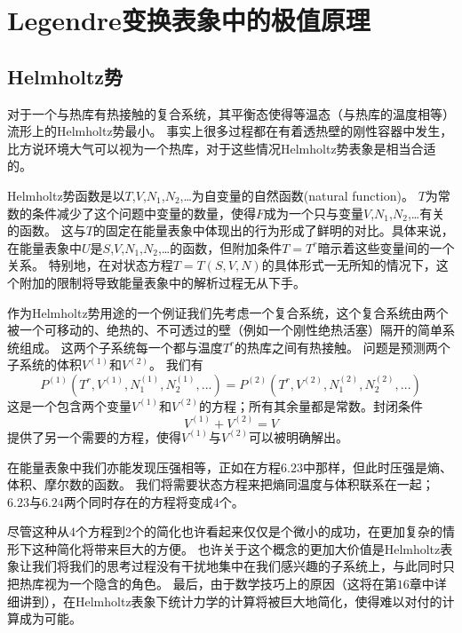 \chapter{Legendre变换表象中的极值原理}
\label{chap6}

\section{Helmholtz势}
\label{sec6.2}

对于一个与热库有热接触的复合系统，其平衡态使得等温态（与热库的温度相等）流形上的Helmholtz势最小。
事实上很多过程都在有着透热壁的刚性容器中发生，比方说环境大气可以视为一个热库，对于这些情况Helmholtz势表象是相当合适的。

 Helmholtz势函数是以$T$,$V$,$N_1$,$N_2$,…为自变量的自然函数(natural function)。
$T$为常数的条件减少了这个问题中变量的数量，使得$F$成为一个只与变量$V$,$N_1$,$N_2$,…有关的函数。
这与$T$的固定在能量表象中体现出的行为形成了鲜明的对比。具体来说，在能量表象中$U$是$S$,$V$,$N_1$,$N_2$,…的函数，但附加条件$T=T^r$暗示着这些变量间的一个关系。
特别地，在对状态方程$T=T(S, V, N)$的具体形式一无所知的情况下，这个附加的限制将导致能量表象中的解析过程无从下手。

作为Helmholtz势用途的一个例证我们先考虑一个复合系统，这个复合系统由两个被一个可移动的、绝热的、不可透过的壁（例如一个刚性绝热活塞）隔开的简单系统组成。
这两个子系统每一个都与温度$T^r$的热库之间有热接触。
问题是预测两个子系统的体积$V^{(1)}$和$V^{(2)}$。
我们有
\begin{equation}
\label{equ6.23}
P^{(1)}\left(T^r, V^{(1)}, N_1^{(1)}, N_2^{(1)}, ...\right)=P^{(2)}\left(T^r, V^{(2)}, N_1^{(2)}, N_2^{(2)}, ...\right)
\end{equation}
这是一个包含两个变量$V^{(1)}$和$V^{(2)}$的方程；所有其余量都是常数。封闭条件
\begin{equation}
\label{equ6.24}
V^{(1)}+V^{(2)}=V
\end{equation}
提供了另一个需要的方程，使得$V^{(1)}$与$V^{(2)}$可以被明确解出。

在能量表象中我们亦能发现压强相等，正如在方程$6.23$中那样，但此时压强是熵、体积、摩尔数的函数。
我们将需要状态方程来把熵同温度与体积联系在一起；$6.23$与$6.24$两个同时存在的方程将变成$4$个。

尽管这种从$4$个方程到$2$个的简化也许看起来仅仅是个微小的成功，在更加复杂的情形下这种简化将带来巨大的方便。
也许关于这个概念的更加大价值是Helmholtz表象让我们将我们的思考过程没有干扰地集中在我们感兴趣的子系统上，与此同时只把热库视为一个隐含的角色。
最后，由于数学技巧上的原因（这将在第$16$章中详细讲到），在Helmholtz表象下统计力学的计算将被巨大地简化，使得难以对付的计算成为可能。

